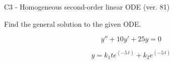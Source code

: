 \begin{exercise}
  \begin{exerciseTitle}C3 - Homogeneous second-order linear ODE (ver. 81)\end{exerciseTitle}
  \begin{exerciseStatement}
    
Find the general solution to the given ODE.

    
\[y''+10y'+25y = 0\]

  \end{exerciseStatement}
  \begin{exerciseAnswer}
    
\[y= k_{1} t e^{\left(-5 \, t\right)} + k_{2} e^{\left(-5 \, t\right)}\]

  \end{exerciseAnswer}
\end{exercise}